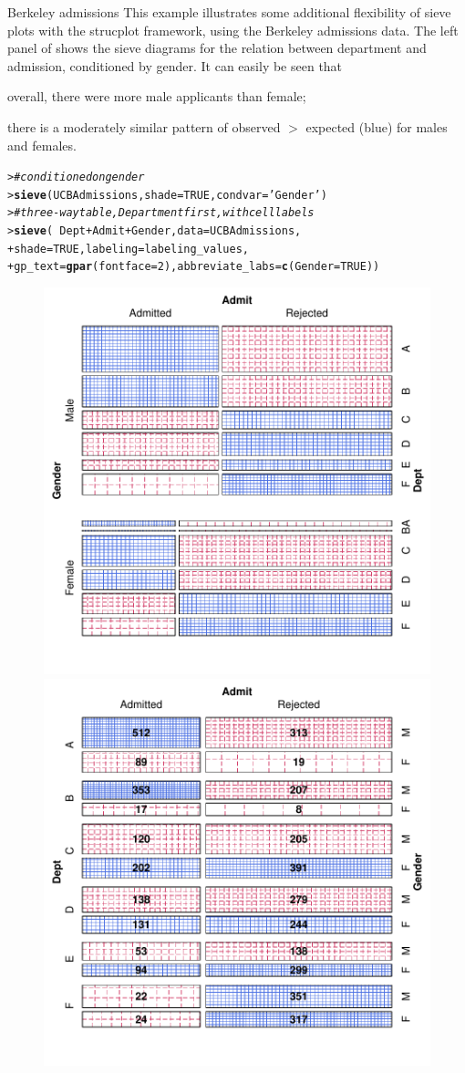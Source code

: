 \documentclass[10pt,krantz2]{krantz}\usepackage[]{graphicx}\usepackage[]{color}
\makeatletter
\newcommand{\hlnum}[1]{\textcolor[rgb]{0.686,0.059,0.569}{#1}}%
\newcommand{\hlstr}[1]{\textcolor[rgb]{0.192,0.494,0.8}{#1}}%
\newcommand{\hlcom}[1]{\textcolor[rgb]{0.678,0.584,0.686}{\textit{#1}}}%
\newcommand{\hlopt}[1]{\textcolor[rgb]{0,0,0}{#1}}%
\newcommand{\hlstd}[1]{\textcolor[rgb]{0.345,0.345,0.345}{#1}}%
\newcommand{\hlkwc}[1]{\textcolor[rgb]{0.333,0.667,0.333}{#1}}%
\newcommand{\hlkwd}[1]{\textcolor[rgb]{0.737,0.353,0.396}{\textbf{#1}}}%
\newenvironment{kframe}{%
 \def\at@end@of@kframe{}%
 \ifinner\ifhmode%
  \def\at@end@of@kframe{\end{minipage}}%
  \begin{minipage}{\columnwidth}%
 \fi\fi%
 \def\FrameCommand##1{\hskip\@totalleftmargin \hskip-\fboxsep
 \colorbox{shadecolor}{##1}\hskip-\fboxsep
     \hskip-\linewidth \hskip-\@totalleftmargin \hskip\columnwidth}%
 \MakeFramed {\advance\hsize-\width
   \@totalleftmargin\z@ \linewidth\hsize
   \@setminipage}}%
 {\par\unskip\endMakeFramed%
 \at@end@of@kframe}
\newenvironment{knitrout}{}{} %
\renewenvironment{knitrout}{\small\renewcommand{\baselinestretch}{.85}}{} %
\makeatother
\begin{document}
\begin{Example}[berkeley3]{Berkeley admissions}
This example illustrates some additional flexibility of sieve plots
with the strucplot framework, using the Berkeley admissions data.
The left panel of  shows the sieve diagrams for
the relation between department and admission, conditioned by gender.
It can easily be seen that
\begin{seriate}
  \item overall, there were more male applicants than female;
  \item there is a moderately similar pattern of observed $>$ expected (blue)
  for males and females.
\end{seriate}
\begin{knitrout}
\color{fgcolor}\begin{kframe}
\begin{alltt}
\hlstd{> }\hlcom{# conditioned on gender}
\hlstd{> }\hlkwd{sieve}\hlstd{(UCBAdmissions,} \hlkwc{shade}\hlstd{=}\hlnum{TRUE}\hlstd{,} \hlkwc{condvar}\hlstd{=}\hlstr{'Gender'}\hlstd{)}
\hlstd{> }\hlcom{# three-way table, Department first, with cell labels}
\hlstd{> }\hlkwd{sieve}\hlstd{(}\hlopt{~} \hlstd{Dept} \hlopt{+} \hlstd{Admit} \hlopt{+} \hlstd{Gender,} \hlkwc{data} \hlstd{= UCBAdmissions,}
\hlstd{+ }      \hlkwc{shade} \hlstd{=} \hlnum{TRUE}\hlstd{,} \hlkwc{labeling} \hlstd{= labeling_values,}
\hlstd{+ }      \hlkwc{gp_text} \hlstd{=} \hlkwd{gpar}\hlstd{(}\hlkwc{fontface} \hlstd{=} \hlnum{2}\hlstd{),} \hlkwc{abbreviate_labs} \hlstd{=} \hlkwd{c}\hlstd{(}\hlkwc{Gender} \hlstd{=} \hlnum{TRUE}\hlstd{))}
\end{alltt}
\end{kframe}\begin{figure}[!htbp]

\centerline{\includegraphics[width=.49\textwidth]{ch04/fig/berkeley-sieve-1} 
\includegraphics[width=.49\textwidth]{ch04/fig/berkeley-sieve-2} }


\end{figure}
\end{knitrout}
\end{Example}
\end{document}
